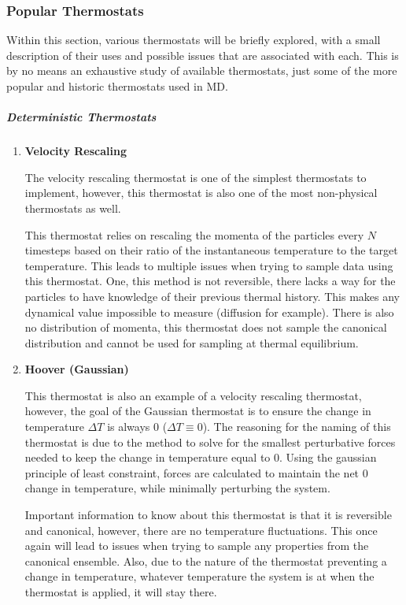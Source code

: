 \documentclass[9pt,bestpractices]{livecoms}
\begin{document}
\subsubsection{Popular Thermostats}
Within this section, various thermostats will be briefly explored, with a small
description of their uses and possible issues that are associated with each.
This is by no means an exhaustive study of available thermostats, just some
of the more popular and historic thermostats used in MD.

\subparagraph{Deterministic Thermostats}
\begin{enumerate}[listparindent=\parindent]
    \item \textbf{Velocity Rescaling}

        The velocity rescaling thermostat is one of the simplest thermostats to
        implement, however, this thermostat is also one of the most non-physical
        thermostats as well.

         This thermostat relies on rescaling the momenta of the particles every
         $N$ timesteps based on their ratio of the instantaneous temperature to
         the target temperature\cite{thermostatAlgorithms2005}.  This leads to
         multiple issues when trying to sample data using this thermostat.  One,
         this method is not reversible, there lacks a way for the particles to
         have knowledge of their previous thermal history.  This makes any
         dynamical value impossible to measure (diffusion for example).  There
         is also no distribution of momenta, this thermostat does not sample the
         canonical distribution and cannot be used for sampling at thermal
         equilibrium.

    \item \textbf{Hoover (Gaussian)}
        
        This thermostat is also an example of a velocity rescaling thermostat,
        however, the goal of the Gaussian thermostat is to ensure the change in
        temperature $\Delta T$ is always 0 ($\Delta T \equiv 0$).  The reasoning
        for the naming of this thermostat is due to the method to solve for the
        smallest perturbative forces needed to keep the change in temperature
        equal to 0. Using the gaussian principle of least constraint, forces are
        calculated to maintain the net 0 change in temperature, while minimally
        perturbing the system\cite{thermostatAlgorithms2005}.

        Important information to know about this thermostat is that it is
        reversible and canonical, however, there are no temperature
        fluctuations. This once again will lead to issues when trying to sample
        any properties from the canonical ensemble. Also, due to the nature of
        the thermostat preventing a change in temperature, whatever temperature
        the system is at when the thermostat is applied, it will stay there. 


\end{enumerate}
\end{document}
